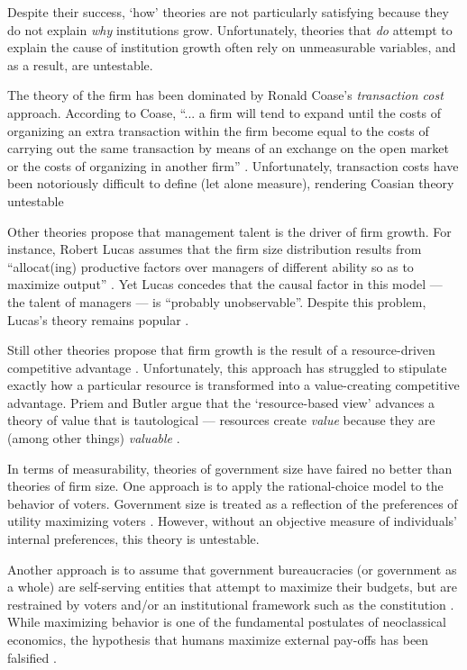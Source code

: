 Despite their success, `how' theories are not particularly satisfying because they do not explain \emph{why} institutions grow. Unfortunately, theories that \emph{do} attempt to explain the cause of institution growth often rely on unmeasurable variables, and as a result, are untestable.

The theory of the firm has been dominated by Ronald Coase's  \textit{transaction cost} approach. According to Coase, ``... a firm will tend to expand until the costs of organizing an extra transaction within the firm become equal to the costs of carrying out the same transaction by means of an exchange on the open market or the costs of organizing in another firm'' \cite{coase_nature_1937}. Unfortunately, transaction costs have been notoriously difficult to define (let alone measure), rendering Coasian theory  untestable  \cite{geroski_growth_1999,nitzan_capital_2009}

Other theories propose that management talent is the driver of firm growth.  For instance, Robert Lucas assumes that the firm size distribution results from ``allocat(ing) productive factors over managers of different ability so as to maximize output'' \cite{lucas_jr_size_1978}. Yet Lucas concedes that the causal factor in this model --- the talent of managers --- is  ``probably unobservable''. Despite this problem, Lucas's theory remains popular \cite{gomes_human_2014,poschke_firm_2014}.

Still other theories propose that firm growth is the result of a resource-driven competitive advantage \cite{barney_firm_1991,peteraf_cornerstones_1993}. Unfortunately, this approach has struggled to stipulate exactly how a particular resource is transformed into a value-creating competitive advantage. Priem and Butler argue that the `resource-based view' advances a theory of value that is tautological --- resources create \emph{value} because they are (among other things) \emph{valuable} \cite{priem_tautology_2001}. 

In terms of measurability, theories of government size have faired no better than theories of firm size. One approach is to apply the rational-choice model to the behavior of voters. Government size is treated as a reflection of the preferences of utility maximizing voters \cite{meltzer_rational_1981,peltzman_growth_1980}.
However, without an objective measure of individuals' internal preferences, this theory is untestable.

Another approach is to assume that government bureaucracies (or government as a whole) are self-serving entities that attempt to maximize their budgets, but are restrained by voters and/or an institutional framework such as the constitution 
\cite{brennan_power_1980,niskanen_bureaucracy_1974}.   While maximizing behavior is one of the fundamental postulates of neoclassical economics, the hypothesis that humans maximize external pay-offs has been falsified \cite{henrich_search_2001}. 

